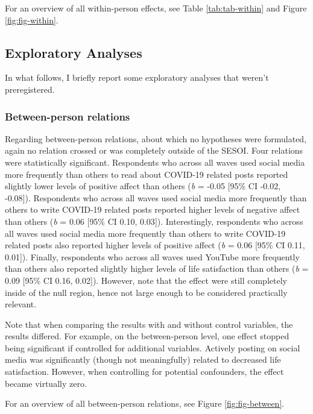 \documentclass[
  man,mask]{apa7}
\begin{document}
For an overview of all within-person effects, see Table \ref{tab:tab-within} and Figure \ref{fig:fig-within}.

\hypertarget{exploratory-analyses}{%
\subsection{Exploratory Analyses}\label{exploratory-analyses}}

In what follows, I briefly report some exploratory analyses that weren't preregistered.

\hypertarget{between-person-relations}{%
\subsubsection{Between-person relations}\label{between-person-relations}}

Regarding between-person relations, about which no hypotheses were formulated, again no relation crossed or was completely outside of the SESOI.
Four relations were statistically significant.
Respondents who across all waves used social media more frequently than others to read about COVID-19 related posts reported slightly lower levels of positive affect than others (\emph{b} = -0.05 {[}95\% CI -0.02, -0.08{]}).
Respondents who across all waves used social media more frequently than others to write COVID-19 related posts reported higher levels of negative affect than others (\emph{b} = 0.06 {[}95\% CI 0.10, 0.03{]}).
Interestingly, respondents who across all waves used social media more frequently than others to write COVID-19 related posts also reported higher levels of positive affect (\emph{b} = 0.06 {[}95\% CI 0.11, 0.01{]}).
Finally, respondents who across all waves used YouTube more frequently than others also reported slightly higher levels of life satisfaction than others (\emph{b} = 0.09 {[}95\% CI 0.16, 0.02{]}).
However, note that the effect were still completely inside of the null region, hence not large enough to be considered practically relevant.

Note that when comparing the results with and without control variables, the results differed.
For example, on the between-person level, one effect stopped being significant if controlled for additional variables.
Actively posting on social media was significantly (though not meaningfully) related to decreased life satisfaction.
However, when controlling for potential confounders, the effect became virtually zero.

For an overview of all between-person relations, see Figure \ref{fig:fig-between}.
\end{document}
